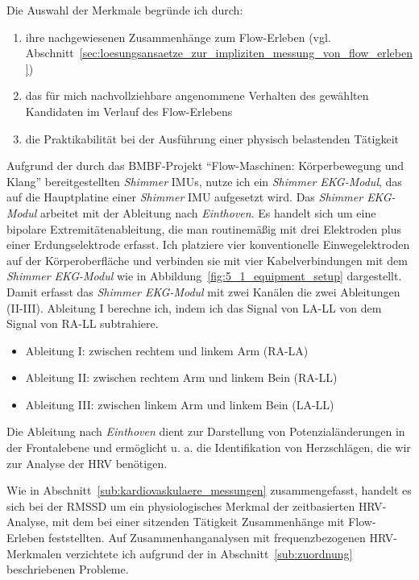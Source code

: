 Die Auswahl der Merkmale begründe ich durch:

\begin{enumerate}
	\item ihre nachgewiesenen Zusammenhänge zum Flow-Erleben (vgl. Abschnitt~\ref{sec:loesungsansaetze_zur_impliziten_messung_von_flow_erleben})
	\item das für mich nachvollziehbare angenommene Verhalten des gewählten Kandidaten im Verlauf des Flow-Erlebens
	\item die Praktikabilität bei der Ausführung einer physisch belastenden Tätigkeit
\end{enumerate}

Aufgrund der durch das \acs{BMBF}-Projekt "`Flow-Maschinen: Körperbewegung und Klang"' bereitgestellten \emph{Shimmer} \acp{IMU}, nutze ich ein \emph{Shimmer EKG-Modul}, das auf die Hauptplatine einer \emph{Shimmer} \ac{IMU} aufgesetzt wird. Das \emph{Shimmer EKG-Modul} arbeitet mit der Ableitung nach \emph{Einthoven}. Es handelt sich um eine bipolare Extremitätenableitung, die man routinemäßig mit drei Elektroden plus einer Erdungselektrode erfasst. Ich platziere vier konventionelle Einwegelektroden auf der Körperoberfläche und verbinden sie mit vier Kabelverbindungen mit dem \emph{Shimmer EKG-Modul} wie in Abbildung~\ref{fig:5_1_equipment_setup} dargestellt. Damit erfasst das \emph{Shimmer EKG-Modul} mit zwei Kanälen die zwei Ableitungen (II-III). Ableitung I berechne ich, indem ich das Signal von LA-LL von dem Signal von RA-LL subtrahiere.

\begin{itemize}
	\item Ableitung I: zwischen rechtem und linkem Arm (RA-LA)
	\item Ableitung II: zwischen rechtem Arm und linkem Bein (RA-LL)
	\item Ableitung III: zwischen linkem Arm und linkem Bein (LA-LL)
\end{itemize}

Die Ableitung nach \emph{Einthoven} dient zur Darstellung von Potenzialänderungen in der Frontalebene und ermöglicht u. a. die Identifikation von Herzschlägen, die wir zur Analyse der \ac{HRV} benötigen.

Wie in Abschnitt~\ref{sub:kardiovaskulaere_messungen} zusammengefasst, handelt es sich bei der \acs{RMSSD} um ein physiologisches Merkmal der zeitbasierten \ac{HRV}-Analyse, mit dem \citet{Keller2011} bei einer sitzenden Tätigkeit Zusammenhänge mit Flow-Erleben feststellten. Auf Zusammenhanganalysen mit frequenzbezogenen \ac{HRV}-Merkmalen verzichtete ich aufgrund der in Abschnitt~\ref{sub:zuordnung} beschriebenen Probleme.

